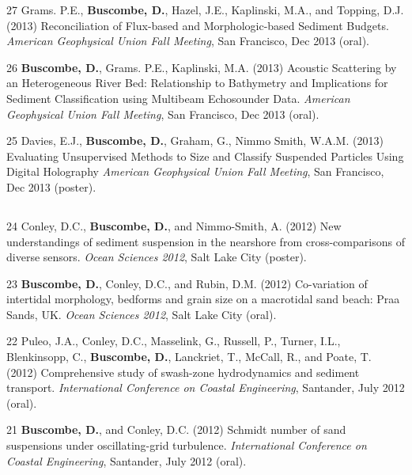 \documentclass[margin,line]{resume}
\begin{document}
\begin{resume}
\begin{footnotesize}
\begin{list1}
	\item[27] Grams. P.E., {\bf Buscombe, D.}, Hazel, J.E., Kaplinski, M.A., and Topping, D.J. (2013) Reconciliation of Flux-based and Morphologic-based Sediment Budgets. {\sl American Geophysical Union Fall Meeting}, San Francisco, Dec 2013 (oral). \\

	\item[26] {\bf Buscombe, D.}, Grams. P.E., Kaplinski, M.A. (2013) Acoustic Scattering by an Heterogeneous River Bed: Relationship to Bathymetry and Implications for Sediment Classification using Multibeam Echosounder Data. {\sl American Geophysical Union Fall Meeting}, San Francisco, Dec 2013 (oral). \\

	\item[25] Davies, E.J., {\bf Buscombe, D.}, Graham, G., Nimmo Smith, W.A.M. (2013) Evaluating Unsupervised Methods to Size and Classify Suspended Particles Using Digital Holography {\sl American Geophysical Union Fall Meeting}, San Francisco, Dec 2013 (poster). 
	\end{list1}

	\subsection{}
	\begin{list1}
        \item[24] Conley, D.C., {\bf Buscombe, D.}, and Nimmo-Smith, A. (2012) New understandings of sediment suspension in the nearshore from cross-comparisons of diverse  sensors. {\sl Ocean Sciences 2012}, Salt Lake City (poster).\\

	\item[23] {\bf Buscombe, D.}, Conley, D.C., and Rubin, D.M. (2012) Co-variation of intertidal morphology, bedforms and grain size on a macrotidal sand beach: Praa Sands, UK. {\sl Ocean Sciences 2012}, Salt Lake City (oral).\\

	\item[22] Puleo, J.A., Conley, D.C., Masselink, G., Russell, P., Turner, I.L., Blenkinsopp, C., {\bf Buscombe, D.}, Lanckriet, T., McCall, R., and Poate, T. (2012) Comprehensive study of swash-zone hydrodynamics and sediment transport. {\sl International Conference on Coastal Engineering}, Santander, July 2012 (oral).\\

	\item[21] {\bf Buscombe, D.}, and Conley, D.C. (2012) Schmidt number of sand suspensions under oscillating-grid turbulence. {\sl International Conference on Coastal Engineering}, Santander, July 2012 (oral).\\


\end{list1}
\end{footnotesize}
\end{resume}
\end{document}
